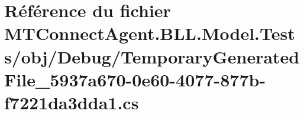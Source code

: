 \hypertarget{_m_t_connect_agent_8_b_l_l_8_model_8_tests_2obj_2_debug_2_temporary_generated_file__5937a670-0e60-4077-877b-f7221da3dda1_8cs}{}\section{Référence du fichier M\+T\+Connect\+Agent.\+B\+L\+L.\+Model.\+Tests/obj/\+Debug/\+Temporary\+Generated\+File\+\_\+5937a670-\/0e60-\/4077-\/877b-\/f7221da3dda1.cs}
\label{_m_t_connect_agent_8_b_l_l_8_model_8_tests_2obj_2_debug_2_temporary_generated_file__5937a670-0e60-4077-877b-f7221da3dda1_8cs}
